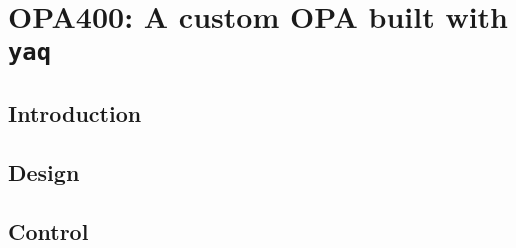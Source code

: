 \chapter{OPA400: A custom OPA built with \texttt{yaq}} \label{cha:opa400}

\clearpage

\section{Introduction}  %

\clearpage

\section{Design}  %

\section{Control}  %

\clearpage
